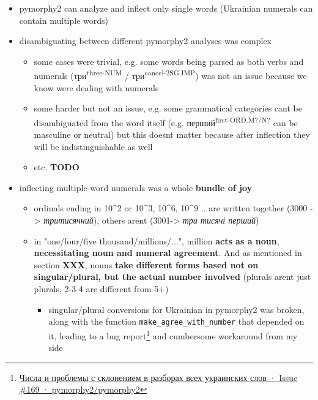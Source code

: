 \begin{itemize}
\tightlist
\item
  pymorphy2 can analyze and inflect only single words (Ukrainian
  numerals can contain multiple words)
\item
  disambiguating between different pymorphy2 analyses was complex

  \begin{itemize}
  \tightlist
  \item
    some cases were trivial, e.g. some words being parsed as both verbs
    and numerals (три\textsuperscript{three-NUM} /
    три\textsuperscript{cancel-2SG.IMP}) was not an issue because we know
    we\textquotesingle re dealing with numerals
  \item
    some harder but not an issue, e.g. some grammatical categories
    can\textquotesingle t be disambiguated from the word itself (e.g.
    перший\textsuperscript{first-ORD.M?/N?} can be masculine or neutral) but
    this doesn\textquotesingle t matter because after inflection they
    will be indistinguishable as well
  \item
    etc. \textbf{TODO}
  \end{itemize}
\item
  inflecting multiple-word numerals was a whole \textbf{bundle of joy}

  \begin{itemize}
  \tightlist
  \item
    ordinals ending in 10\^{}2 or 10\^{}3, 10\^{}6, 10\^{}9 .. are
    written together (3000 -\textgreater{} \emph{тритисячний}), others
    aren\textquotesingle t (3001-\textgreater{} \emph{три тисячі
    перший})
  \item
    in "one/four/five thousand/millions/...", million \textbf{acts as a
    noun}, \textbf{necessitating noun and numeral agreement}. And as
    mentioned in section \textbf{XXX}, nouns \textbf{take different
    forms based not on singular/plural, but the actual number involved}
    (plurals aren\textquotesingle t just plurals, 2-3-4 are different
    from 5+)

    \begin{itemize}
    \tightlist
    \item
      singular/plural conversions for Ukrainian in pymorphy2 was broken,
      along with the function \texttt{make\_agree\_with\_number} that
      depended on it, leading to a bug report\footnote{\href{https://github.com/pymorphy2/pymorphy2/issues/169}{Числа
        и проблемы с склонением в разборах всех украинских слов · Issue
        \#169 · pymorphy2/pymorphy2}} and cumbersome workaround from my
      side
    \end{itemize}
  \end{itemize}
\end{itemize}

